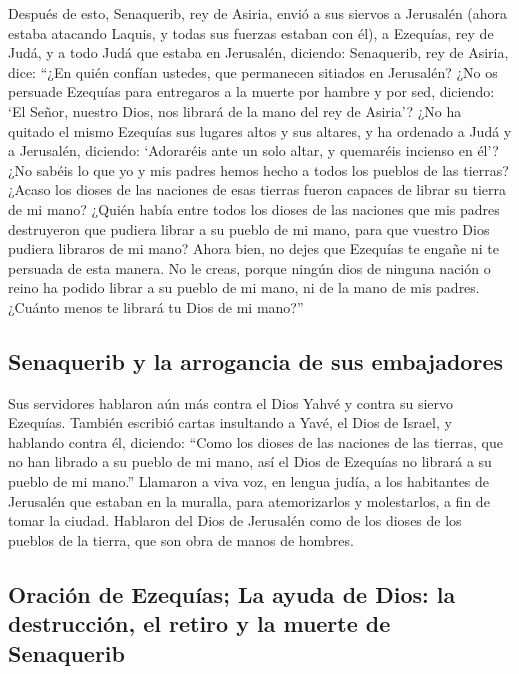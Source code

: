 \begin{paracol}{2}
 Después de esto, Senaquerib, rey de Asiria, envió a sus
siervos a Jerusalén (ahora estaba atacando Laquis, y todas sus fuerzas
estaban con él), a Ezequías, rey de Judá, y a todo Judá que estaba en
Jerusalén, diciendo:  Senaquerib, rey de Asiria, dice:
``¿En quién confían ustedes, que permanecen sitiados en Jerusalén?
 ¿No os persuade Ezequías para entregaros a la muerte por
hambre y por sed, diciendo: `El Señor, nuestro Dios, nos librará de la
mano del rey de Asiria'?  ¿No ha quitado el mismo
Ezequías sus lugares altos y sus altares, y ha ordenado a Judá y a
Jerusalén, diciendo: `Adoraréis ante un solo altar, y quemaréis incienso
en él'?  ¿No sabéis lo que yo y mis padres hemos hecho a
todos los pueblos de las tierras? ¿Acaso los dioses de las naciones de
esas tierras fueron capaces de librar su tierra de mi mano?
 ¿Quién había entre todos los dioses de las naciones que
mis padres destruyeron que pudiera librar a su pueblo de mi mano, para
que vuestro Dios pudiera libraros de mi mano?  Ahora
bien, no dejes que Ezequías te engañe ni te persuada de esta manera. No
le creas, porque ningún dios de ninguna nación o reino ha podido librar
a su pueblo de mi mano, ni de la mano de mis padres. ¿Cuánto menos te
librará tu Dios de mi mano?''

\hypertarget{senaquerib-y-la-arrogancia-de-sus-embajadores}{%
\subsection{Senaquerib y la arrogancia de sus
embajadores}\label{senaquerib-y-la-arrogancia-de-sus-embajadores}}

 Sus servidores hablaron aún más contra el Dios Yahvé y
contra su siervo Ezequías.  También escribió cartas
insultando a Yavé, el Dios de Israel, y hablando contra él, diciendo:
``Como los dioses de las naciones de las tierras, que no han librado a
su pueblo de mi mano, así el Dios de Ezequías no librará a su pueblo de
mi mano.''  Llamaron a viva voz, en lengua judía, a los
habitantes de Jerusalén que estaban en la muralla, para atemorizarlos y
molestarlos, a fin de tomar la ciudad.  Hablaron del Dios
de Jerusalén como de los dioses de los pueblos de la tierra, que son
obra de manos de hombres.

\hypertarget{oraciuxf3n-de-ezequuxedas-la-ayuda-de-dios-la-destrucciuxf3n-el-retiro-y-la-muerte-de-senaquerib}{%
\subsection{Oración de Ezequías; La ayuda de Dios: la destrucción, el
retiro y la muerte de
Senaquerib}\label{oraciuxf3n-de-ezequuxedas-la-ayuda-de-dios-la-destrucciuxf3n-el-retiro-y-la-muerte-de-senaquerib}}


\end{paracol}
